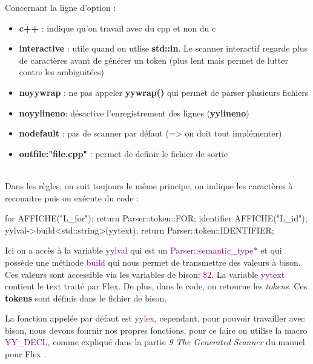 \documentclass[a4paper]{article}%
\begin{document}
\noindent
Concernant la ligne d'option :
\begin{itemize}
\item \textbf{c++} : indique qu'on travail avec du cpp et non du c
\item \textbf{interactive} : utile quand on utlise \textbf{std::in}. Le scanner interactif regarde plus de caractères avant de générer un token (plus lent mais permet de lutter contre les ambiguitées)
\item \textbf{noyywrap} : ne pas appeler \textbf{yywrap()} qui permet de parser plusieurs fichiers
\item \textbf{noyylineno}: désactive l'enregistrement des lignes (\textbf{yylineno})
\item \textbf{nodefault} : pas de scanner par défaut (=> on doit tout implémenter)
\item \textbf{outfile:"file.cpp"} : permet de definir le fichier de sortie
\end{itemize}\leavevmode\\[3\baselineskip]


\noindent
Dans les règles, on suit toujours le même principe, on indique les caractères à reconaitre puis on exécute du code :\\

\begin{code}
for          { AFFICHE("L_for"); return Parser::token::FOR; }
{identifier} {
  AFFICHE("L_id");
  yylval->build<std::string>(yytext);
  return Parser::token::IDENTIFIER;
}
\end{code}\leavevmode\newline

\noindent
Ici on a accès à la variable \textcolor{purple}{yylval} qui est un \textcolor{purple}{Parser::semantic\_type*} et qui possède une méthode \textcolor{purple}{build} qui nous permet de transmettre des valeurs à bison.\\
Ces valeurs sont accessible via les variables de bison: \textcolor{purple}{\$2}. La variable
\textcolor{purple}{yytext} contient le text traité par Flex. De plus, dans le code, on retourne
les \textit{tokens}. Ces \textbf{tokens} sont définis dans le fichier de bison.
\newline

La fonction appelée par défaut est \textcolor{purple}{yylex}, cependant, pour pouvoir travailler avec bison, nous devons fournir nos propres fonctions, pour ce faire on utilise la macro \textcolor{purple}{YY\_DECL}, comme expliqué dans la partie \textit{9 The Generated Scanner} du manuel pour Flex \cite{flexmanual}.
\end{document}
